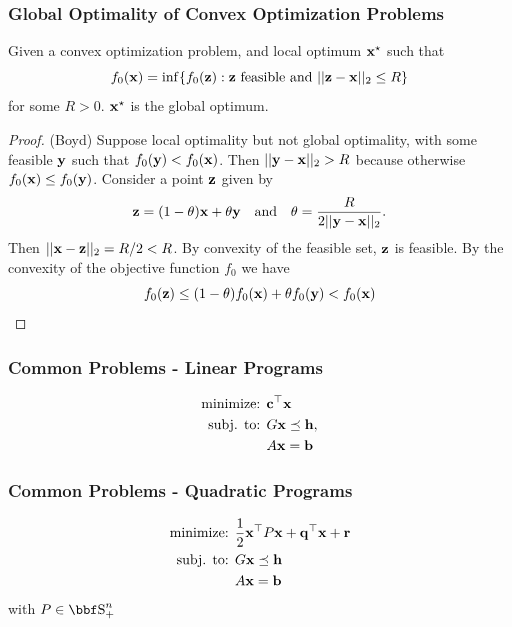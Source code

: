 \documentclass{beamer}
\begin{document}
\begin{frame}
    \frametitle{Global Optimality of Convex Optimization Problems}
    
    \begin{theorem}
        Given a convex optimization problem, and local optimum ${\bf x}^\star$
        such that
        \[
            f_0({\bf x}) = \inf\{f_0({\bf z}) : {\bf z}\text{ feasible and } ||{\bf z}-{\bf x}||_2 \leq R\}
        \]
        for some $R > 0$. ${\bf x}^\star$ is the global optimum.
    \end{theorem}
    \begin{proof}
        (Boyd)
        Suppose local optimality but not global optimality, with some feasible ${\bf y}$
        such that $f_0({\bf y}) < f_0({\bf x})$. Then $||{\bf y}-{\bf x}||_2 >R$ because otherwise $f_0({\bf x})
        \leq f_0({\bf y})$. Consider a point ${\bf z}$ given by
        \[
            {\bf z} = (1-\theta){\bf x}+ \theta{\bf y} \quad\text{and}\quad \theta=\frac{R}{2||{\bf y}-{\bf x}||_2}.
        \]
        Then $||{\bf x}-{\bf z}||_2=R/2 < R$. By convexity of the feasible set,
        ${\bf z}$ is feasible. By the convexity of the objective function $f_0$
        we have
        \[
            f_0({\bf z}) \leq (1-\theta)f_0({\bf x}) + \theta f_0({\bf y}) < f_0({\bf x})
        \]
    \end{proof}
\end{frame}

\begin{frame}
    \frametitle{Common Problems - Linear Programs}

    \begin{align*}
        \text{minimize: } & {\bf c}^\top{\bf x}\\
        \text{subj. to: } & G{\bf x} \preceq {\bf h},\\
                          & A{\bf x} = {\bf b}
    \end{align*}
\end{frame}

\begin{frame}
    \frametitle{Common Problems - Quadratic Programs}

    \begin{align*}
        \text{minimize: } & \frac{1}{2}{\bf x}^\top P{\bf x} + {\bf q}^\top{\bf x} + {\bf r}\\
        \text{subj. to: } & G{\bf x} \preceq{\bf h}\\
                          & A{\bf x} = {\bf b}
    \end{align*}
    with $P \in \SS_+^n$
\end{frame}
\end{document}
